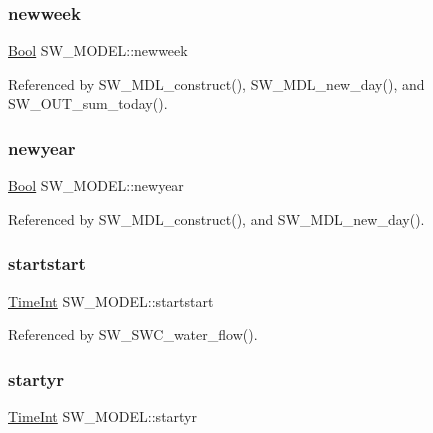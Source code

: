 \subsubsection{\texorpdfstring{newweek}{newweek}}
{\footnotesize\ttfamily \hyperlink{generic_8h_a39db6982619d623273fad8a383489309}{Bool} S\+W\+\_\+\+M\+O\+D\+E\+L\+::newweek}



Referenced by S\+W\+\_\+\+M\+D\+L\+\_\+construct(), S\+W\+\_\+\+M\+D\+L\+\_\+new\+\_\+day(), and S\+W\+\_\+\+O\+U\+T\+\_\+sum\+\_\+today().

\mbox{\label{struct_s_w___m_o_d_e_l_aa63d4c1bbd8153d2bc8c73c4a0b415cc}} 
\subsubsection{\texorpdfstring{newyear}{newyear}}
{\footnotesize\ttfamily \hyperlink{generic_8h_a39db6982619d623273fad8a383489309}{Bool} S\+W\+\_\+\+M\+O\+D\+E\+L\+::newyear}



Referenced by S\+W\+\_\+\+M\+D\+L\+\_\+construct(), and S\+W\+\_\+\+M\+D\+L\+\_\+new\+\_\+day().

\mbox{\label{struct_s_w___m_o_d_e_l_acc7f14d03928972cab78b3bd83d0d68c}} 
\subsubsection{\texorpdfstring{startstart}{startstart}}
{\footnotesize\ttfamily \hyperlink{_times_8h_a25ac787161a5cad0e3fdfe5a5aeb3236}{Time\+Int} S\+W\+\_\+\+M\+O\+D\+E\+L\+::startstart}



Referenced by S\+W\+\_\+\+S\+W\+C\+\_\+water\+\_\+flow().

\mbox{\label{struct_s_w___m_o_d_e_l_a372a89e152904bcc59481c87fe51b0ad}} 
\subsubsection{\texorpdfstring{startyr}{startyr}}
{\footnotesize\ttfamily \hyperlink{_times_8h_a25ac787161a5cad0e3fdfe5a5aeb3236}{Time\+Int} S\+W\+\_\+\+M\+O\+D\+E\+L\+::startyr}



